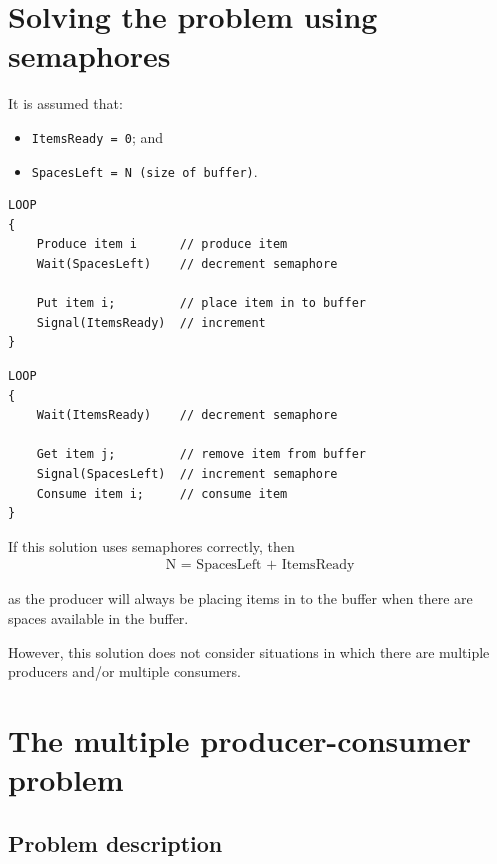 \documentclass[a4paper]{systems-software}
\begin{document}
\section*{Solving the problem using semaphores}

It is assumed that:
\begin{itemize}
	\item \texttt{ItemsReady = 0}; and
	\item \texttt{SpacesLeft = N (size of buffer)}.
\end{itemize}

\begin{lstlisting}[title={Producer class.}]
LOOP
{
	Produce item i      // produce item
	Wait(SpacesLeft)    // decrement semaphore

	Put item i;         // place item in to buffer
	Signal(ItemsReady)  // increment
}
\end{lstlisting}

\newpage

\begin{lstlisting}[title={Consumer class.}]
LOOP
{
	Wait(ItemsReady)    // decrement semaphore

	Get item j;         // remove item from buffer
	Signal(SpacesLeft)  // increment semaphore
	Consume item i;     // consume item
}
\end{lstlisting}

If this solution uses semaphores correctly, then
\begin{equation*}
	\begin{aligned}
		\text{N = SpacesLeft + ItemsReady}
	\end{aligned}
\end{equation*}

as the producer will always be placing items in to the buffer when there are spaces available in the buffer.

However, this solution does not consider situations in which there are multiple producers and/or multiple consumers.


\newpage

\section*{The multiple producer-consumer problem}

\subsection*{Problem description}
\end{document}
